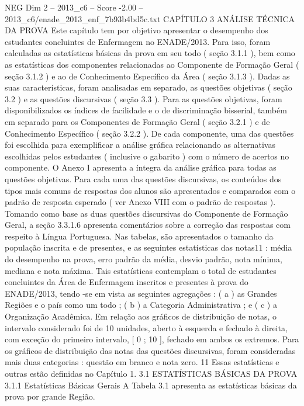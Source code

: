\begin{textsample}{NEG Dim 2 – 2013\_c6 – Score -2.00 – 2013\_c6/enade\_2013\_enf\_7b93b4bd5c.txt}  \label{ex:f2_neg_058}
CAPÍTULO 3 ANÁLISE TÉCNICA DA PROVA Este capítulo tem por objetivo apresentar o desempenho dos estudantes concluintes de Enfermagem no ENADE/2013.
Para isso, foram calculadas as estatísticas básicas da prova em seu todo ( seção 3.1.1 ), bem como as estatísticas dos componentes relacionadas ao Componente de Formação Geral ( seção 3.1.2 ) e ao de Conhecimento Específico da Área ( seção 3.1.3 ).
Dadas as suas características, foram analisadas em separado, as questões objetivas ( seção 3.2 ) e as questões discursivas ( seção 3.3 ).
Para as questões objetivas, foram disponibilizados os índices de facilidade e o de discriminação bisserial, também em separado para os Componentes de Formação Geral ( seção 3.2.1 ) e de Conhecimento Específico ( seção 3.2.2 ).
De cada componente, uma das questões foi escolhida para exemplificar a análise gráfica relacionando as alternativas escolhidas pelos estudantes ( inclusive o gabarito ) com o número de acertos no componente.
O Anexo I apresenta a íntegra da análise gráfica para todas as questões objetivas.
Para cada uma das questões discursivas, os conteúdos dos tipos mais comuns de respostas dos alunos são apresentados e comparados com o padrão de resposta esperado ( ver Anexo VIII com o padrão de respostas ).
Tomando como base as duas questões discursivas do Componente de Formação Geral, a seção 3.3.1.6 apresenta comentários sobre a correção das respostas com respeito à Língua Portuguesa.
Nas tabelas, são apresentados o tamanho da população inscrita e de presentes, e as seguintes estatísticas das notas11 : média do desempenho na prova, erro padrão da média, desvio padrão, nota mínima, mediana e nota máxima.
Tais estatísticas contemplam o total de estudantes concluintes da Área de Enfermagem inscritos e presentes à prova do ENADE/2013, tendo -se em vista as seguintes agregações : ( a ) as Grandes Regiões e o país como um todo ; ( b ) a Categoria Administrativa ; e ( c ) a Organização Acadêmica.
Em relação aos gráficos de distribuição de notas, o intervalo considerado foi de 10 unidades, aberto à esquerda e fechado à direita, com exceção do primeiro intervalo, [ 0 ; 10 ], fechado em ambos os extremos.
Para os gráficos de distribuição das notas das questões discursivas, foram consideradas mais duas categorias : questão em branco e nota zero. 11 Essas estatísticas e outras estão definidas no Capítulo 1. 3.1 ESTATÍSTICAS BÁSICAS DA PROVA 3.1.1 Estatísticas Básicas Gerais A Tabela 3.1 apresenta as estatísticas básicas da prova por grande Região.

\end{textsample}
